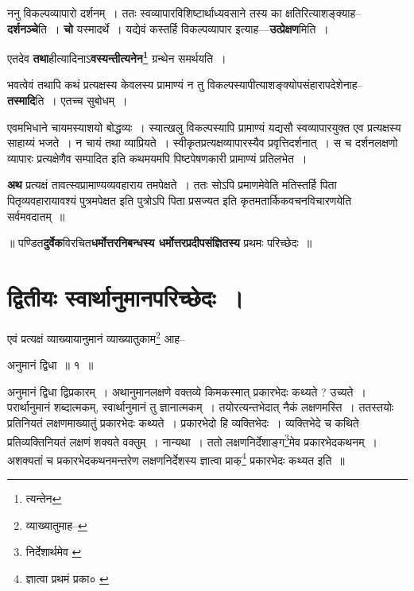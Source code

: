\documentclass[article,12pt,a4paper]{memoir}
\begin{document}
	  \pstart ननु विकल्पव्यापारो दर्शनम् । ततः स्वव्यापारविशिष्टार्थाध्यवसाने तस्य का क्षतिरित्याशङ्क्याह--\textbf{दर्शनञ्चे}ति । \textbf{चो} यस्मादर्थे । यद्येवं कस्तर्हि विकल्पव्यापार इत्याह—\textbf{उत्प्रेक्षण}मिति ।
	\pend
      

	  \pstart एतदेव \textbf{तथा}हीत्यादिनाऽ\textbf{वस्यन्तीत्यनेन\footnote{त्यन्तेन}} ग्रन्थेन समर्थयति ।
	\pend
      

	  \pstart भवत्वेवं तथापि कथं प्रत्यक्षस्य केवलस्य प्रामाण्यं न तु विकल्पस्यापीत्याशङ्क्योपसंहारापदेशेनाह--\textbf{तस्मादि}ति । एतच्च सुबोधम् ।
	\pend
      

	  \pstart एवमभिधाने चायमस्याशयो बोद्धव्यः । स्यात्खलु विकल्पस्यापि प्रामाण्यं यद्यसौ स्वव्यापारयुक्त एव प्रत्यक्षस्य साहाय्यं भजते । न चायं तथा व्याप्रियते । स्वीकृतप्रत्यक्षव्यापारस्यैव प्रवृत्तिदर्शनात् । स च दर्शनलक्षणो व्यापारः प्रत्यक्षेणैव सम्पादित इति कथमयमपि पिष्टपेषणकारी प्रामाण्यं प्रतिलभेत ।
	\pend
      

	  \pstart \textbf{अथ} प्रत्यक्षं तावत्स्वप्रामाण्यव्यव\leavevmode{}हाराय तमपेक्षते । ततः सोऽपि प्रमाणमेवेति मतिस्तर्हि पिता पितृव्यवहारायावश्यं पुत्रमपेक्षत इति पुत्रोऽपि पिता प्रसज्यत इति कृतमतार्किकवचनविचारणयेति सर्वमवदातम् ॥
	\pend
      

	  \pstart ॥ पण्डित\textbf{दुर्वेक}विरचित\textbf{धर्मोत्तरनिबन्धस्य धर्मोत्तरप्रदीपसंज्ञितस्य} प्रथमः परिच्छेदः ॥
	\pend
      
	    
	    \endnumbering%
	    \endgroup
	    
	  
	  
	
	    
	    \begingroup
	    \beginnumbering%
	    
	  
\chapter[{द्वितीयः स्वार्थानुमानपरिच्छेदः ।}]{द्वितीयः स्वार्थानुमानपरिच्छेदः ।}\leavevmode{}
	  \bigskip
	  \begingroup
	

	  \pstart एवं प्रत्यक्षं व्याख्यायानुमानं व्याख्यातुकाम\footnote{व्याख्यातुमाह--\cite{dp-msA}} आह--
	\pend
       
	  \bigskip
	  \begingroup
	

	  \pstart अनुमानं द्विधा ॥ १ ॥
	\pend
      
	  \endgroup
	 

	  \pstart अनुमानं द्विधा द्विप्रकारम् । अथानुमानलक्षणे वक्तव्ये किमकस्मात् प्रकारभेदः कथ्यते ? उच्यते । परार्थानुमानं शब्दात्मकम्, स्वार्थानुमानं तु ज्ञानात्मकम् । तयोरत्यन्तभेदात् नैकं लक्षणमस्ति । ततस्तयोः प्रतिनियतं लक्षणमाख्यातुं प्रकारभेदः कथ्यते । प्रकारभेदो हि व्यक्तिभेदः । व्यक्तिभेदे च कथिते प्रतिव्यक्तिनियतं लक्षणं शक्यते वक्तुम् । नान्यथा । ततो लक्षणनिर्देशाङ्ग\footnote{निर्देशार्थमेव \cite{dp-msA} \cite{dp-msC}}मेव प्रकारभेदकथनम् । अशक्यतां च प्रकारभेदकथनमन्तरेण लक्षणनिर्देशस्य ज्ञात्वा प्राक्\footnote{ज्ञात्वा प्रथमं प्रका० \cite{dp-msC} \cite{dp-msD}} प्रकारभेदः कथ्यत इति ॥
	\pend
      
\end{document}

